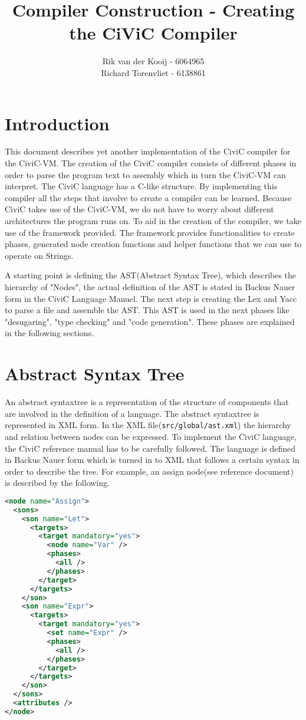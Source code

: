 \documentclass[a4paper]{article}
\author{Rik van der Kooij - 6064965\\
Richard Torenvliet - 6138861}
\title{Compiler Construction - Creating the CiViC Compiler}
\begin{document}
\lstset{
    numbers=left,
    tabsize=2,
}


\tableofcontents
\maketitle
{}
\section{Introduction}
This document describes yet another implementation of the CiviC compiler for
the CiviC-VM. The creation of the CiviC compiler consists of different phases
in order to parse the program text to assembly which in turn the CiviC-VM can
interpret. The CiviC language has a C-like structure. By implementing this
compiler all the steps that involve to create a compiler can be learned.
Because CiviC takes use of the CiviC-VM, we do not have to worry about
different architectures the program runs on. To aid in the creation of the
compiler, we take use of the framework provided. The framework provides
functionalities to create phases, generated node creation functions and helper
functions that we can use to operate on Strings.

A starting point is defining the AST(Abstract Syntax Tree), which
describes the hierarchy of "Nodes", the actual definition of the AST is stated
in Backus Nauer form in the CiviC Language Manuel. The next step is creating the Lex and Yacc to parse a
file and assemble the AST. This AST is used in the next phases like "desugaring", "type checking" and "code generation". These phases are explained in the following sections.

\section{Abstract Syntax Tree}
An abstract syntaxtree is a representation of the structure of components that
are involved in the definition of a language.
The abstract syntaxtree is represented in XML form. In the XML
file(\texttt{src/global/ast.xml}) the hierarchy and relation between nodes can
be expressed. To implement the CiviC language, the CiviC reference manual has
to be carefully followed. The language is defined in Backus Nauer form which is
turned in to XML that follows a certain syntax in order to describe the tree.
For example, an assign node(see reference document) is described by the
following.

\begin{lstlisting}[language=XML]
 <node name="Assign">
  <sons>
    <son name="Let">
      <targets>
        <target mandatory="yes">
          <node name="Var" />
          <phases>
            <all />
          </phases>
        </target>
      </targets>
    </son>
    <son name="Expr">
      <targets>
        <target mandatory="yes">
          <set name="Expr" />
          <phases>
            <all />
          </phases>
        </target>
      </targets>
    </son>
  </sons>
  <attributes />
</node>
\end{lstlisting}
\end{document}
